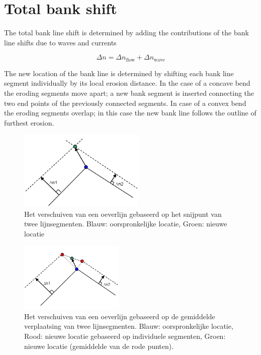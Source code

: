 \section{Total bank shift} \label{Sec4.3}

The total bank line shift is determined by adding the contributions of the bank line shifts due to waves and currents

\begin{equation}
\Delta n = \Delta n_\text{flow} + \Delta n_\text{wave}
\end{equation}

The new location of the bank line is determined by shifting each bank line segment individually by its local erosion distance.
In the case of a concave bend the eroding segments move apart; a new bank segment is inserted connecting the two end points of the previously connected segments.
In case of a convex bend the eroding segments overlap; in this case the new bank line follows the outline of furthest erosion.

\begin{figure}
\includegraphics[width=6cm]{figures/Fig4-3.png}
\caption{Het verschuiven van een oeverlijn gebaseerd op het snijpunt van twee lijnsegmenten.
Blauw: oorspronkelijke locatie, Groen: nieuwe locatie}
\label{Fig4.3}
\end{figure}

\begin{figure}
\includegraphics[width=5cm]{figures/Fig4-4.png}
\caption{Het verschuiven van een oeverlijn gebaseerd op de gemiddelde verplaatsing van twee lijnsegmenten.
Blauw: oorspronkelijke locatie, Rood: nieuwe locatie gebaseerd op individuele segmenten, Groen: nieuwe locatie (gemiddelde van de rode punten).}
\label{Fig4.4}
\end{figure}


